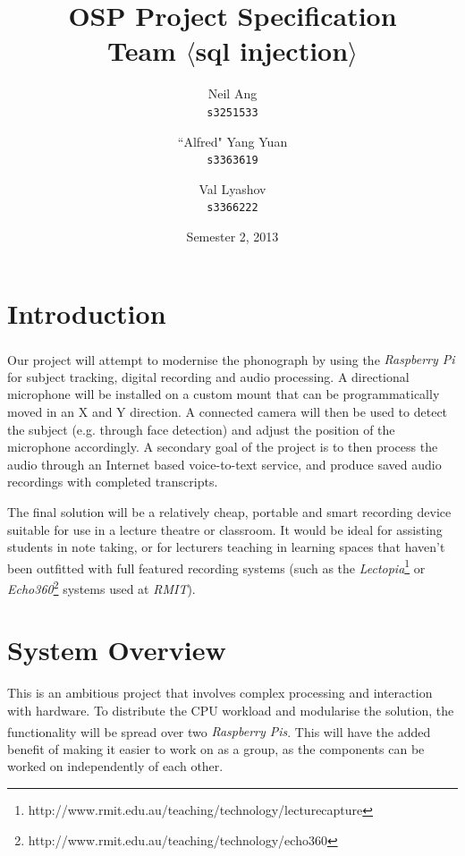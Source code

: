 \documentclass[11pt,a4paper,titlepage]{report}
\title{OSP Project Specification \\ Team $\langle$sql injection$\rangle$}
\author{
  Neil Ang\\
  \texttt{s3251533}
  \and
  ``Alfred" Yang Yuan\\
  \texttt{s3363619}
  \and
  Val Lyashov\\
  \texttt{s3366222}
}
\date{Semester 2, 2013}
\newcommand{\rpi}{\textit{Raspberry Pi\textsuperscript{\textregistered}}}
\newcommand{\rpis}{\textit{Raspberry Pi\textsuperscript{\textregistered}s}}
\begin{document}
\maketitle

\pagebreak
\tableofcontents
\thispagestyle{empty}
\pagebreak

\section{Introduction}

Our project will attempt to modernise the phonograph by using the \rpi\xspace for subject tracking, digital recording and audio processing. A directional microphone will be installed on a custom mount that can be programmatically moved in an X and Y direction. A connected camera will then be used to detect the subject (e.g. through face detection) and adjust the position of the microphone accordingly. A secondary goal of the project is to then process the audio through an Internet based voice-to-text service, and produce saved audio recordings with completed transcripts.

The final solution will be a relatively cheap, portable and smart recording device suitable for use in a lecture theatre or classroom. It would be ideal for assisting students in note taking, or for lecturers teaching in learning spaces that haven't been outfitted with full featured recording systems (such as the \textit{Lectopia}\footnote{http://www.rmit.edu.au/teaching/technology/lecturecapture} or \textit{Echo360}\footnote{http://www.rmit.edu.au/teaching/technology/echo360} systems used at \textit{RMIT}).


\section{System Overview}

This is an ambitious project that involves complex processing and interaction with hardware. To distribute the CPU workload and modularise the solution, the functionality will be spread over two \rpis. This will have the added benefit of making it easier to work on as a group, as the components can be worked on independently of each other.
\end{document}
